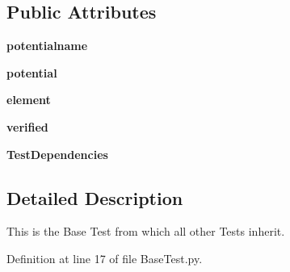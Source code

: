 \subsection*{Public Attributes}
\begin{DoxyCompactItemize}
\item 
\hypertarget{classBaseTest_1_1BaseTest_ab7dc01a5da78c687b1e3ef5695c6bb10}{
{\bfseries potentialname}}
\label{classBaseTest_1_1BaseTest_ab7dc01a5da78c687b1e3ef5695c6bb10}

\item 
\hypertarget{classBaseTest_1_1BaseTest_a0ab2e64475afb484074b0effbab3fbc4}{
{\bfseries potential}}
\label{classBaseTest_1_1BaseTest_a0ab2e64475afb484074b0effbab3fbc4}

\item 
\hypertarget{classBaseTest_1_1BaseTest_a8278580db97a9db5498314f3ea38edb9}{
{\bfseries element}}
\label{classBaseTest_1_1BaseTest_a8278580db97a9db5498314f3ea38edb9}

\item 
\hypertarget{classBaseTest_1_1BaseTest_a7d542ba468826e5c1d9bead8f6d33f15}{
{\bfseries verified}}
\label{classBaseTest_1_1BaseTest_a7d542ba468826e5c1d9bead8f6d33f15}

\item 
\hypertarget{classBaseTest_1_1BaseTest_a9dc99538651adf4352d5e389221aa646}{
{\bfseries TestDependencies}}
\label{classBaseTest_1_1BaseTest_a9dc99538651adf4352d5e389221aa646}

\end{DoxyCompactItemize}


\subsection{Detailed Description}
\begin{DoxyVerb}This is the Base Test from which all other Tests inherit.\end{DoxyVerb}
 

Definition at line 17 of file BaseTest.py.



